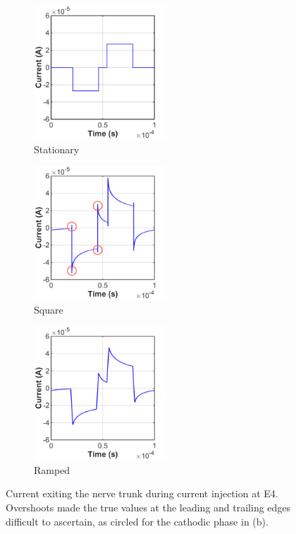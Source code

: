 \begin{figure}[p]
    \centering
    \begin{subfigure}[t]{0.33\textwidth}
        \centering
        \includegraphics[width=5cm]{Simulations/TimeDep/I_NVIII-term4-hemi_gnd-stat}
        \caption{Stationary}
        \label{fig:nerve_current_stat}
    \end{subfigure}%
    \hfill%
    \begin{subfigure}[t]{0.33\textwidth}
        \centering
        \includegraphics[width=5cm]{Simulations/TimeDep/I_NVIII-term4-hemi_gnd-S5000-circ}
        \caption{Square}
        \label{fig:nerve_current_S5000}
    \end{subfigure}%
    \hfill%
    \begin{subfigure}[t]{0.33\textwidth}
        \centering
        \includegraphics[width=5cm]{Simulations/TimeDep/I_NVIII-term4-hemi_gnd-R300}
        \caption{Ramped}
        \label{fig:nerve_current_R300}
    \end{subfigure}%
    
	\caption[Current exiting the nerve trunk]{Current exiting the nerve trunk
	during current injection at E4. Overshoots made the true values at the leading
	and trailing edges difficult to ascertain, as circled for the cathodic phase
	in (b).}
	\label{fig:current_comparison_td}
\end{figure}

